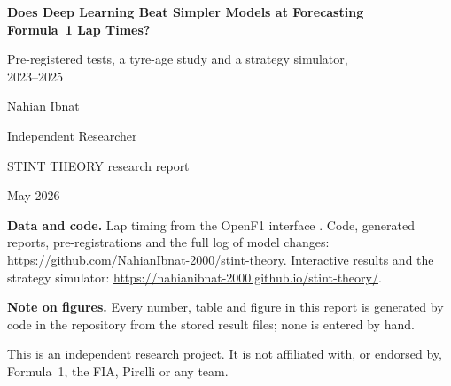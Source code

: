 \documentclass[12pt]{article}
\begin{document}
\begin{titlepage}
\centering
\vspace*{2.2cm}
{\Large\bfseries Does Deep Learning Beat Simpler Models at Forecasting\\[2pt] Formula~1 Lap Times?\par}
\vspace{0.6cm}
{\large Pre-registered tests, a tyre-age study and a strategy simulator,\\ 2023--2025\par}
\vspace{1.4cm}
{\large Nahian Ibnat\par}
\vspace{0.2cm}
{Independent Researcher\par}
\vspace{0.8cm}
{STINT THEORY research report\par}
\vspace{0.2cm}
{May 2026\par}
\vfill
\begin{minipage}{0.86\textwidth}
\small
\textbf{Data and code.} Lap timing from the OpenF1 interface \parencite{openf1}. Code, generated reports, pre-registrations
and the full log of model changes: \url{https://github.com/NahianIbnat-2000/stint-theory}. Interactive results and the
strategy simulator: \url{https://nahianibnat-2000.github.io/stint-theory/}.

\medskip
\textbf{Note on figures.} Every number, table and figure in this report is generated by code in the repository from
the stored result files; none is entered by hand.

\medskip
This is an independent research project. It is not affiliated with, or endorsed by, Formula~1, the FIA, Pirelli or
any team.
\end{minipage}
\end{titlepage}
\end{document}
